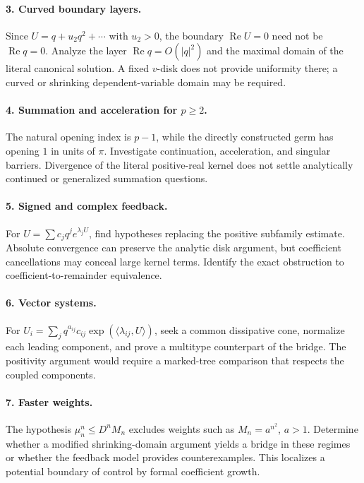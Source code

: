 \documentclass[11pt,a4paper]{article}
\numberwithin{equation}{section}
\theoremstyle{definition}\newtheorem{definition}[theorem]{Definition}
\theoremstyle{remark}\newtheorem{remark}[theorem]{Remark}
\DeclareMathOperator{\Rea}{Re}
\begin{document}
\paragraph{3. Curved boundary layers.}
Since $U=q+u_2q^2+\cdots$ with $u_2>0$, the boundary $\Rea U=0$ need
not be $\Rea q=0$. Analyze the layer $\Rea q=O(|q|^2)$ and the maximal
domain of the literal canonical solution. A fixed $v$-disk does not
provide uniformity there; a curved or shrinking dependent-variable domain
may be required.

\paragraph{4. Summation and acceleration for $p\ge2$.}
The natural opening index is $p-1$, while the directly constructed germ
has opening $1$ in units of $\pi$. Investigate continuation, acceleration,
and singular barriers. Divergence of the literal positive-real kernel
does not settle analytically continued or generalized summation questions.

\paragraph{5. Signed and complex feedback.}
For $U=\sum c_jq^je^{\lambda_jU}$, find hypotheses replacing the positive
subfamily estimate. Absolute convergence can preserve the analytic disk
argument, but coefficient cancellations may conceal large kernel terms.
Identify the exact obstruction to coefficient-to-remainder equivalence.

\paragraph{6. Vector systems.}
For $U_i=\sum_jq^{a_{ij}}c_{ij}
\exp(\langle\lambda_{ij},U\rangle)$, seek a common dissipative cone,
normalize each leading component, and prove a multitype counterpart of
the bridge. The positivity argument would require a marked-tree comparison
that respects the coupled components.

\paragraph{7. Faster weights.}
The hypothesis $\mu_n^n\le D^nM_n$ excludes weights such as
$M_n=a^{n^2}$, $a>1$. Determine whether a modified shrinking-domain
argument yields a bridge in these regimes or whether the feedback model
provides counterexamples. This localizes a potential boundary of control
by formal coefficient growth.
\end{document}
